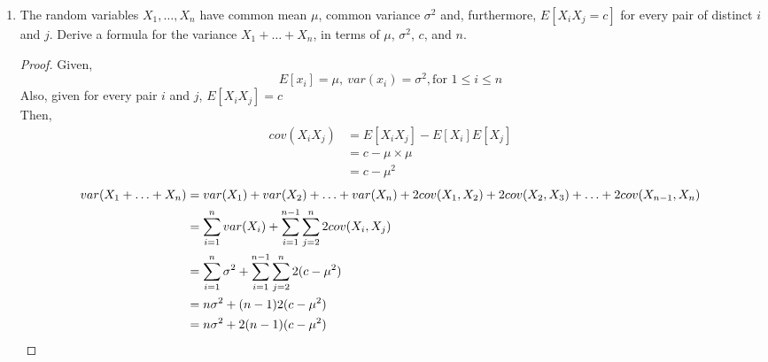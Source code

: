 \documentclass[paper=usletter, fontsize=12pt]{article}
\begin{document}
\begin{enumerate}
\begin{enumerate}
            \item Calculate $f_{X \mid B}(x)$.
            \begin{proof}
            \end{proof}

            \item Calculate $E[XY]$.
            \begin{proof}
            \end{proof}

            \item Calculate the PDF of $Y/X$.
            \begin{proof}
            \end{proof}

        \end{enumerate}

        \item The random variables $X_1,\ldots,X_n$ have common mean $\mu$,
        common variance $\sigma^2$ and, furthermore, $E[X_iX_j=c]$ for every
        pair of distinct $i$ and $j$. Derive a formula for the variance
        $X_1+\ldots+X_n$, in terms of $\mu$, $\sigma^2$, $c$, and $n$.
        \begin{proof}

            Given,
            \begin{equation*}
                E[x_i] = \mu, \  var(x_i) = \sigma^2, \text{for } 1 \le i \le n
            \end{equation*}
            Also, given for every pair $i$ and $j$, $E[X_iX_j]=c$\\
            Then,
            \begin{align*}
                cov(X_iX_j) &= E[X_iX_j] - E[X_i]E[X_j]\\
                & = c - \mu \times \mu\\
                & = c - \mu^2
            \end{align*}
            \begin{align*}
                var(X_1+\ldots+X_n) &= var(X_1) + var(X_2) + \ldots + var(X_n) + 2cov(X_1,X_2) + 2cov(X_2,X_3)+\ldots+ 2cov(X_{n-1},X_{n}) \\
                & = \sum_{i=1}^{n}var(X_i)+\sum_{i=1}^{n-1}\sum_{j=2}^{n}2cov(X_i,X_j)\\
                & = \sum_{i=1}^{n}\sigma^2 + \sum_{i=1}^{n-1}\sum_{j=2}^{n}2(c-\mu^2) \\
                & = n\sigma^2 + (n-1)2(c-\mu^2) \\
                & = n\sigma^2 + 2(n-1)(c-\mu^2)  \qedhere
            \end{align*}
            \endgroup


\end{proof}
\end{enumerate}
\end{document}
